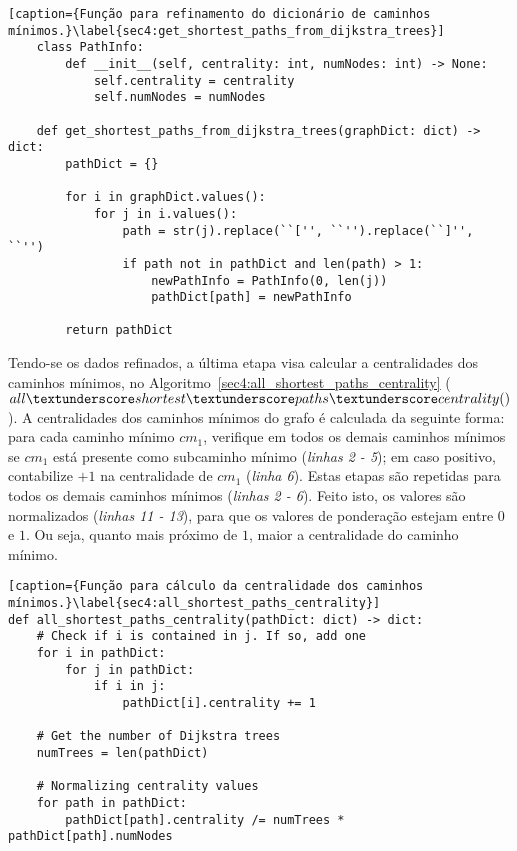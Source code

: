 \begin{lstlisting}[caption={Função para refinamento do dicionário de caminhos mínimos.}\label{sec4:get_shortest_paths_from_dijkstra_trees}]
	class PathInfo:
		def __init__(self, centrality: int, numNodes: int) -> None:
			self.centrality = centrality
			self.numNodes = numNodes

	def get_shortest_paths_from_dijkstra_trees(graphDict: dict) -> dict:
		pathDict = {}

		for i in graphDict.values():
			for j in i.values():
				path = str(j).replace(``['', ``'').replace(``]'', ``'')
				if path not in pathDict and len(path) > 1:
					newPathInfo = PathInfo(0, len(j))
					pathDict[path] = newPathInfo

		return pathDict
\end{lstlisting}

Tendo-se os dados refinados, a última etapa visa calcular a centralidades dos caminhos mínimos, no Algoritmo~\ref{sec4:all_shortest_paths_centrality} (\emph{$all\textunderscore shortest\textunderscore paths\textunderscore centrality()$}). A centralidades dos caminhos mínimos do grafo é calculada da seguinte forma: para cada caminho mínimo $cm_1$, verifique em todos os demais caminhos mínimos se $cm_1$ está presente como subcaminho mínimo (\emph{linhas 2 - 5}); em caso positivo, contabilize $+1$ na centralidade de $cm_1$ (\emph{linha 6}). Estas etapas são repetidas para todos os demais caminhos mínimos (\emph{linhas 2 - 6}). Feito isto, os valores são normalizados (\emph{linhas 11 - 13}), para que os valores de ponderação estejam entre $0$ e $1$. Ou seja, quanto mais próximo de $1$, maior a centralidade do caminho mínimo.

\begin{lstlisting}[caption={Função para cálculo da centralidade dos caminhos mínimos.}\label{sec4:all_shortest_paths_centrality}]
def all_shortest_paths_centrality(pathDict: dict) -> dict:
	# Check if i is contained in j. If so, add one
	for i in pathDict:
		for j in pathDict:
			if i in j:
				pathDict[i].centrality += 1

	# Get the number of Dijkstra trees
	numTrees = len(pathDict)

	# Normalizing centrality values
	for path in pathDict:
		pathDict[path].centrality /= numTrees * pathDict[path].numNodes
\end{lstlisting}
